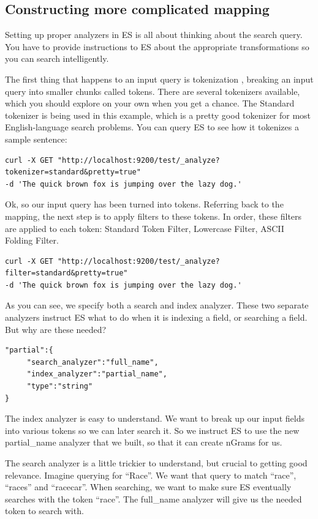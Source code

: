 \subsection{Constructing more complicated mapping}
\par Setting up proper analyzers in ES is all about thinking about the search query. You have to provide instructions to ES about the appropriate transformations so you can search intelligently.
\par The first thing that happens to an input query is tokenization , breaking an input query into smaller chunks called tokens. There are several tokenizers available, which you should explore on your own when you get a chance. The Standard tokenizer is being used in this example, which is a pretty good tokenizer for most English-language search problems. You can query ES to see how it tokenizes a sample sentence:
\begin{verbatim}
curl -X GET "http://localhost:9200/test/_analyze?tokenizer=standard&pretty=true" 
-d 'The quick brown fox is jumping over the lazy dog.'
\end{verbatim}
\par Ok, so our input query has been turned into tokens. Referring back to the mapping, the next step is to apply filters to these tokens. In order, these filters are applied to each token: Standard Token Filter, Lowercase Filter, ASCII Folding Filter.
\begin{verbatim}
curl -X GET "http://localhost:9200/test/_analyze?filter=standard&pretty=true" 
-d 'The quick brown fox is jumping over the lazy dog.'
\end{verbatim}
\par As you can see, we specify both a search and index analyzer. These two separate analyzers instruct ES what to do when it is indexing a field, or searching a field. But why are these needed?
\begin{verbatim}
"partial":{
     "search_analyzer":"full_name",
     "index_analyzer":"partial_name",
     "type":"string"
}
\end{verbatim}
\par The index analyzer is easy to understand. We want to break up our input fields into various tokens so we can later search it. So we instruct ES to use the new partial\_name analyzer that we built, so that it can create nGrams for us.
\par The search analyzer is a little trickier to understand, but crucial to getting good relevance. Imagine querying for “Race”. We want that query to match “race”, “races” and “racecar”. When searching, we want to make sure ES eventually searches with the token “race”. The full\_name analyzer will give us the needed token to search with.
